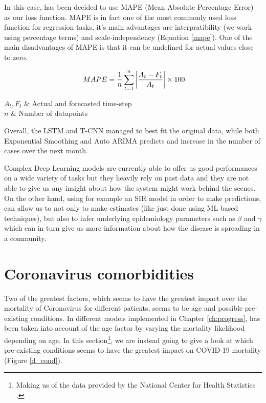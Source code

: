 In this case, has been decided to use MAPE (Mean Absolute Percentage Error) as our loss function. 
MAPE is in fact one of the most commonly used loss function for regression tasks, it's main advantages are interpratibility (we work using percentage terms) and scale-independency (Equation \ref{mape}). One of the main disadvantages of MAPE is that it can be undefined for actual values close to zero.

\useshortskip
\begin{align}
\ MAPE = \dfrac{1}{n} \sum_{t=1}^{n} \abs{\frac{A_{t}-F_{t}}{A_{t}}} \times 100
\label{mape}
\end{align}
\vspace{-0.4cm}
\begin{conditions}
 $A_{t}, F_{t}$  &  Actual and forecasted time-step \\
 $n$  &  Number of datapoints\\
\end{conditions}
\vspace{-0.2cm}
\useshortskip

Overall, the LSTM and T-CNN managed to best fit the original data, while both Exponential Smoothing and Auto ARIMA predicts and increase in the number of cases over the next month.

Complex Deep Learning models are currently able to offer us good performances on a wide variety of tasks but they heavily rely on past data and they are not able to give us any insight about how the system might work behind the scenes. On the other hand, using for example an SIR model in order to make predictions, can allow us to not only to make estimates (like just done using ML based techniques), but also to infer underlying epidemiology parameters such as $\beta$ and $\gamma$ which can in turn give us more information about how the disease is spreading in a community.

\section{Coronavirus comorbidities}
\label{como_app}
Two of the greatest factors, which seems to have the greatest impact over the mortality of Coronavirus for different patients, seems to be age and possible pre-existing conditions. In different models implemented in Chapter \ref{ch:progress}, has been taken into account of the age factor by varying the mortality likelihood depending on age. In this section\footnote{Making us of the data provided by the National Center for Health Statistics \cite{deaths_data}.}, we are instead going to give a look at which pre-existing conditions seems to have the greatest impact on COVID-19 mortality (Figure \ref{d_cond}). 

